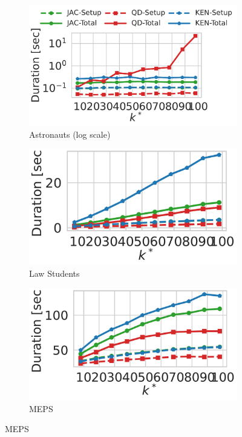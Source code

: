 \begin{figure}[t]
    \begin{subfigure}{.35\textwidth}
      \centering
      \includegraphics[width=.87\linewidth]{figures/astr_k.pdf}
      \hspace{-0.54cm}
      \caption{Astronauts (log scale)}
      \label{fig:r5}
    \end{subfigure}
    \begin{subfigure}{.35\textwidth}
      \centering
      \includegraphics[width=.75\linewidth]{figures/law_k.pdf}
      \caption{Law Students}
      \label{fig:r6}
    \end{subfigure}
    \begin{subfigure}{.35\textwidth}
      \centering
      \includegraphics[width=.75\linewidth]{figures/meps_k.pdf}
      \caption{MEPS}
      \label{fig:r7}

\end{subfigure}
\end{figure}
